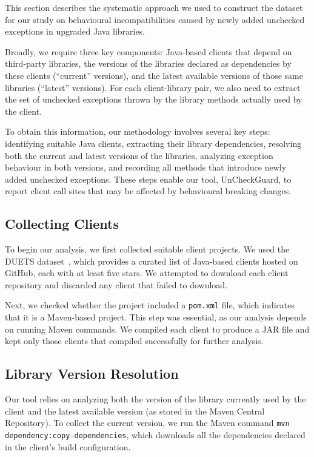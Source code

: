 This section describes the systematic approach we used to construct the dataset for our study on behavioural incompatibilities caused by newly added unchecked exceptions in upgraded Java libraries. 

Broadly, we require three key components: Java-based clients that depend on third-party libraries, the versions of the libraries declared as dependencies by these clients (``current'' versions), and the latest available versions of those same libraries (``latest'' versions). For each client-library pair, we also need to extract the set of unchecked exceptions thrown by the library methods actually used by the client.

To obtain this information, our methodology involves several key steps: identifying suitable Java clients, extracting their library dependencies, resolving both the current and latest versions of the libraries, analyzing exception behaviour in both versions, and recording all methods that introduce newly added unchecked exceptions. These steps enable our tool, UnCheckGuard, to report client call sites that may be affected by behavioural breaking changes.

\subsection{Collecting Clients}

To begin our analysis, we first collected suitable client projects. We used the DUETS dataset~\cite{durieux21:_duets}, which provides a curated list of Java-based clients hosted on GitHub, each with at least five stars. We attempted to download each client repository and discarded any client that failed to download.

Next, we checked whether the project included a \texttt{pom.xml} file, which indicates that it is a Maven-based project. This step was essential, as our analysis depends on running Maven commands. We compiled each client to produce a JAR file and kept only those clients that compiled successfully for further analysis.

\subsection{Library Version Resolution}

Our tool relies on analyzing both the version of the library currently used by the client and the latest available version (as stored in the Maven Central Repository). To collect the current version, we run the Maven command \texttt{mvn dependency:copy-dependencies}, which downloads all the dependencies declared in the client's build configuration.

